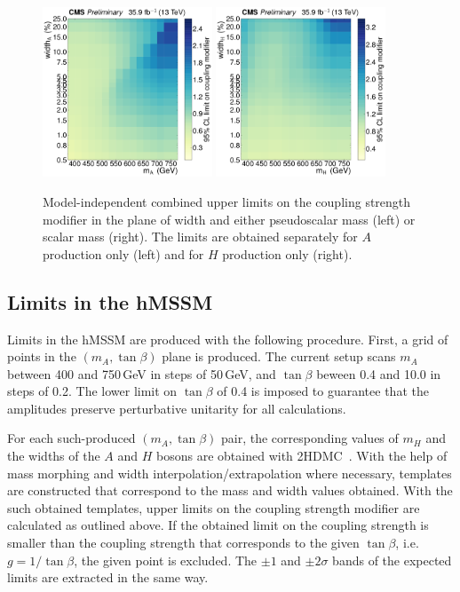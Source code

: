 \begin{figure}[!Hhtb]
\centering
\includegraphics[width=0.45\textwidth,keepaspectratio=true]{fig/chapt8/limits/limit_A_2D.pdf}
\includegraphics[width=0.45\textwidth,keepaspectratio=true]{fig/chapt8/limits/limit_H_2D.pdf}
\caption{Model-independent combined upper limits on the coupling strength modifier in the plane of width and either pseudoscalar mass (left) or scalar mass (right). The limits are obtained separately for $A$ production only (left) and for $H$ production only (right).}
\label{fig:limits_h_widths}
\end{figure}

\subsection{Limits in the hMSSM}

Limits in the hMSSM are produced with the following procedure.
First, a grid of points in the $(m_A, \tan\beta)$ plane is produced.
The current setup scans $m_A$ between 400 and 750\,GeV in steps of 50\,GeV,
and $\tan\beta$ beween 0.4 and 10.0 in steps of 0.2.
The lower limit on $\tan\beta$ of 0.4 is imposed to guarantee that the amplitudes preserve perturbative unitarity for all calculations.

For each such-produced $(m_A, \tan\beta)$ pair, the corresponding values of $m_H$ and the widths of the $A$ and $H$ bosons are obtained with 2HDMC~\cite{2hdmc}.
With the help of mass morphing and width interpolation/extrapolation where necessary, templates are constructed that correspond to the mass and width values obtained.
With the such obtained templates, upper limits on the coupling strength modifier are calculated as outlined above.
If the obtained limit on the coupling strength is smaller than the coupling strength that corresponds to the given $\tan\beta$, i.e.\ $g = 1/\tan\beta$, the given point is excluded.
The $\pm 1$ and $\pm 2\sigma$ bands of the expected limits are extracted in the same way.

